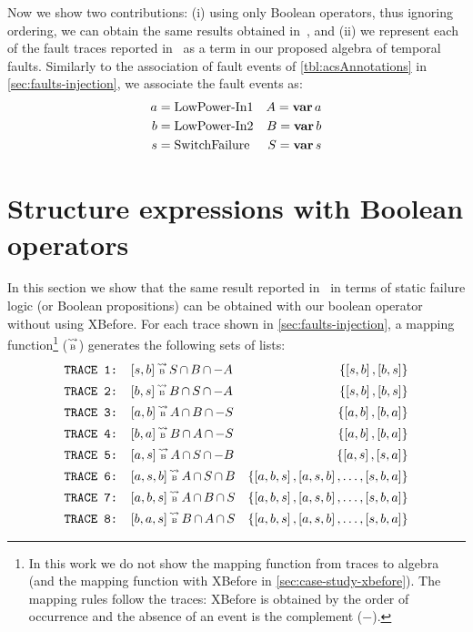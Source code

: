 \documentclass[en,twoside,onehalfspacing,phd]{risethesis}
\def\varop{\ensuremath\operatorname{\mathbf{var}}}
\newcommand{\var}[1]{\ensuremath\varop #1}
\def\tracetobool{\ensuremath\operatorname{\stackrel{\leadsto}{\text{\tiny B}}}}
\newcommand{\setsin}[1]{\ensuremath\left\{ #1 \right\}}
\newcommand{\listsin}[1]{\ensuremath\left[ #1 \right]}
\def\inter{\ensuremath\operatorname{\cap}}
\begin{document}

Now we show two contributions: (i) using only Boolean operators, thus ignoring ordering, we can obtain the same results obtained in~\cite{DM2012}, and (ii) we represent each of the fault traces reported in~\cite{DM2012} as a term in our proposed algebra of temporal faults.
Similarly to the association of fault events of \cref{tbl:acsAnnotations} in \cref{sec:faults-injection}, we associate the fault events as:
%
\begin{align*}
a &= \text{LowPower-In1}& A = \var a\\
b &= \text{LowPower-In2}& B = \var b\\
s &= \text{SwitchFailure}& S = \var s
\end{align*}

\section{Structure expressions with Boolean operators}

In this section we show that the same result reported in~\cite{DM2012} in terms of static failure logic (or Boolean propositions) can be obtained with our boolean operator without using XBefore.
For each trace shown in \cref{sec:faults-injection}, a mapping function\footnote{In this work we do not show the mapping function from traces to \ac{algebra} (and the mapping function with XBefore in \cref{sec:case-study-xbefore}).
The mapping rules follow the traces: XBefore is obtained by the order of occurrence and the absence of an event is the complement ($-$).} ($\tracetobool$) generates the following sets of lists:
%
\begin{align*}
\text{\texttt{TRACE 1: }}&[s,b] \tracetobool S \inter B \inter -A & \setsin{\listsin{s,b},\listsin{b,s}}\\
\text{\texttt{TRACE 2: }}&[b,s] \tracetobool B \inter S \inter -A & \setsin{\listsin{s,b},\listsin{b,s}}\\
\text{\texttt{TRACE 3: }}&[a,b] \tracetobool A \inter B \inter -S & \setsin{\listsin{a,b},\listsin{b,a}}\\
\text{\texttt{TRACE 4: }}&[b,a] \tracetobool B \inter A \inter -S & \setsin{\listsin{a,b},\listsin{b,a}}\\
\text{\texttt{TRACE 5: }}&[a,s] \tracetobool A \inter S \inter -B & \setsin{\listsin{a,s},\listsin{s,a}}\\
\text{\texttt{TRACE 6: }}&[a,s,b] \tracetobool A \inter S \inter B & \setsin{\listsin{a,b,s},\listsin{a,s,b},\ldots,\listsin{s,b,a}}\\
\text{\texttt{TRACE 7: }}&[a,b,s] \tracetobool A \inter B \inter S & \setsin{\listsin{a,b,s},\listsin{a,s,b},\ldots,\listsin{s,b,a}}\\
\text{\texttt{TRACE 8: }}&[b,a,s] \tracetobool B \inter A \inter S & \setsin{\listsin{a,b,s},\listsin{a,s,b},\ldots,\listsin{s,b,a}}\\
\end{align*}
\end{document}
